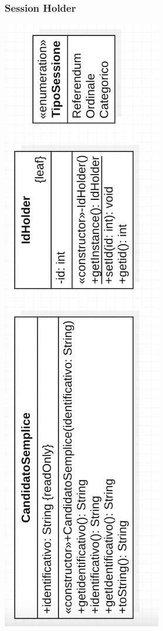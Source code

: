 \documentclass[11pt, oneside]{article}   	%
\begin{document}
\subsubsection{Session Holder}
\begin{center}
\includegraphics[scale=0.6]{images/class11.png}
\end{center}
\end{document}
